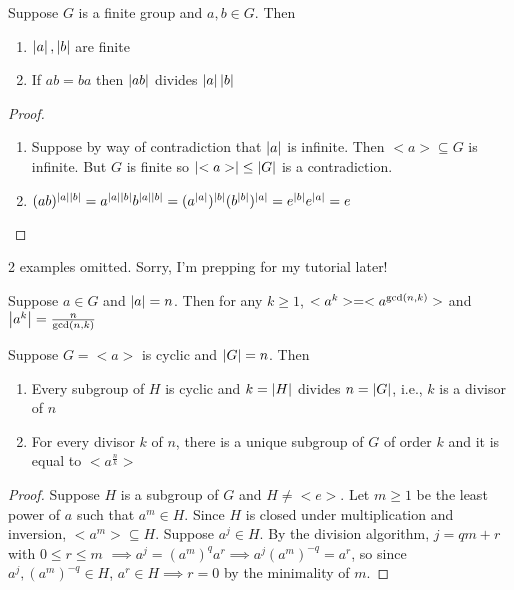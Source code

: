 \begin{corollary}
    Suppose $G$ is a finite group and $a,b \in G$. Then \begin{enumerate}
        \item $\left|a\right|, \left|b\right|$ are finite
        \item If $ab = ba$ then $\left|ab\right|$ divides $\left|a\right| \left|b\right|$
    \end{enumerate}
\end{corollary}
\begin{proof}
    \begin{enumerate}
        \item Suppose by way of contradiction that $\left|a\right|$ is infinite. Then $<a> \subseteq G$ is infinite. But $G$ is finite so $\left|<a>\right| \leq \left|G\right|$ is a contradiction.
        \item $(ab)^{\left|a\right|\left|b\right|} = a^{\left|a\right|\left|b\right|}b^{\left|a\right|\left|b\right|} = (a^{\left|a\right|})^{\left|b\right|}(b^{\left|b\right|})^{\left|a\right|} = e^{\left|b\right|}e^{\left|a\right|} = e$
    \end{enumerate}
\end{proof}

2 examples omitted. Sorry, I'm prepping for my tutorial later! 

\begin{theorem}
    Suppose $a \in G$ and $\left|a\right| = n$. Then for any $k \geq 1$, $<a^k> = <a^{\gcd \left(n,k\right)}>$ and $\left|a^k\right| = \frac{n}{\gcd \left(n, k\right)}$
\end{theorem}

\begin{theorem}
    Suppose $G = <a>$ is cyclic and $\left|G\right| = n$. Then \begin{enumerate}
        \item Every subgroup of $H$ is cyclic and $k = \left|H\right|$ divides $n = \left|G\right|$, i.e., $k$ is a divisor of $n$
        \item For every divisor $k$ of $n$, there is a unique subgroup of $G$ of order $k$ and it is equal to $<a^{\frac{n}{k}}>$
    \end{enumerate}
\end{theorem}
\begin{proof}
    Suppose $H$ is a subgroup of $G$ and $H \neq <e>$. Let $m \geq 1$ be the least power of $a$ such that $a^m \in H$. Since $H$ is closed under multiplication and inversion, $<a^m> \subseteq H$. Suppose $a^j \in H$. By the division algorithm, $j = qm + r$ with $0 \leq r \leq m$ $\implies a^j = \left(a^m\right)^q a^r \implies a^j \left(a^m\right)^{-q} = a^r$, so since $a^j,\left(a^m\right)^{-q} \in H$, $a^r \in H \implies r = 0$ by the minimality of $m$.
\end{proof}